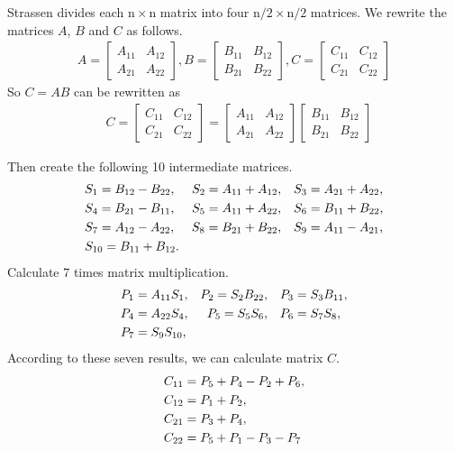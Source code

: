 \documentclass[journal]{IEEEtran}
\begin{document}
Strassen divides each $\mathrm{n}\times\mathrm{n}$ matrix into four $\mathrm{n}/2 \times \mathrm{n}/2$ matrices.
We rewrite the matrices $A$, $B$ and $C$ as follows.
\begin{align}
A={
  \left[ \begin{array}{ccc}
    A_{11} & A_{12} \\
    A_{21} & A_{22}  
    \end{array} 
    \right ]
},B={
  \left[ \begin{array}{ccc}
    B_{11} & B_{12} \\
    B_{21} & B_{22}  
    \end{array} 
    \right ]
},C={
  \left[ \begin{array}{ccc}
    C_{11} & C_{12} \\
    C_{21} & C_{22}  
    \end{array} 
    \right ]
}\label{A}
\end{align}
So $C=AB$ can be rewritten as 
\begin{align}
  &C={
  \left[ \begin{array}{ccc}
    C_{11} & C_{12} \\
    C_{21} & C_{22}  
    \end{array} 
    \right ]
}={
  \left[ \begin{array}{ccc}
    A_{11} & A_{12} \\
    A_{21} & A_{22}  
    \end{array} 
    \right ]
}{
  \left[ \begin{array}{ccc}
    B_{11} & B_{12} \\
    B_{21} & B_{22}  
    \end{array} 
    \right ]
}
\end{align} 


Then create the following 10 intermediate matrices.
\begin{align}
&S_1=B_{12}-B_{22},
&S_2=A_{11}+A_{12},\notag
& \ \ \ S_3=A_{21}+A_{22},\\ \notag
&S_4=B_{21}-B_{11},
&S_5=A_{11}+A_{22},
& \ \ \ S_6=B_{11}+B_{22},\\ \notag
&S_7=A_{12}-A_{22},
&S_8=B_{21}+B_{22},
& \ \ \ S_9=A_{11}-A_{21},\\ \notag
&S_{10}=B_{11}+B_{12}. 
\end{align} 
Calculate 7 times matrix multiplication.
\begin{align}
 &P_1=A_{11}S_1,
 &P_2=S_2B_{22},\notag
 &\ \ \ P_3=S_3B_{11}, \\\notag
 &P_4=A_{22}S_4,
 &P_5=S_5S_6,
 &\ \ \ P_6=S_7S_8,\\ \notag
 &P_7=S_9S_{10},
\end{align}
According to these seven results, we can calculate matrix $C$.
\begin{align}
  \notag
&C_{11}=P_5+P_4-P_2+P_6,\\ \notag
&C_{12}=P_1+P_2,\\ \notag
&C_{21}=P_3+P_4,\\ \notag
&C_{22}=P_5+P_1-P_3-P_7 \notag
\end{align}
\end{document}
